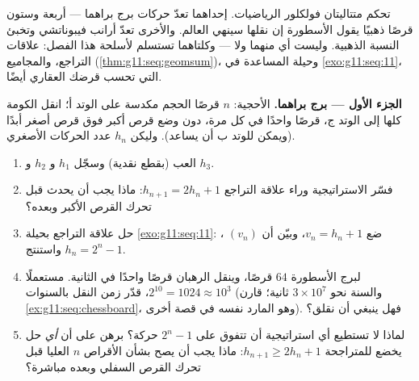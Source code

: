 \begin{problem}
\label{pb:g11:seq:1}
تحكم متتاليتان فولكلور الرياضيات. إحداهما تعدّ
حركات برج براهما --- أربعة وستون قرصًا ذهبيًا يقول
الأسطورة إن نقلها سينهي العالم. والأخرى تعدّ
أرانب فيبوناتشي وتخبئ النسبة الذهبية. وليست أي منهما
 ولا  --- وكلتاهما تستسلم لأسلحة هذا الفصل:
علاقات التراجع، والمجاميع 
(\cref{thm:g11:seq:geomsum})، وحيلة  المساعدة في
\cref{exo:g11:seq:11}، التي تحسب قرضك العقاري أيضًا.

\medskip
\noindent\textbf{الجزء الأول --- برج براهما.}
الأحجية: $n$ قرصًا  الحجم مكدسة على الوتد أ؛
انقل الكومة كلها إلى الوتد ج، قرصًا واحدًا في كل مرة، دون وضع
قرص أكبر فوق قرص أصغر أبدًا (ويمكن للوتد ب أن يساعد). وليكن $h_n$
عدد الحركات الأصغري.
\begin{enumerate}
  \item العب (بقطع نقدية) وسجّل $h_1$ و $h_2$ و $h_3$.
  \item فسّر الاستراتيجية وراء علاقة التراجع
        $h_{n+1} = 2h_n + 1$: ماذا يجب أن يحدث قبل تحرك
        القرص الأكبر وبعده؟
  \item حل علاقة التراجع بحيلة
        \cref{exo:g11:seq:11}: ضع $v_n = h_n + 1$، وبيّن أن
        $(v_n)$ ، واستنتج $h_n = 2^n - 1$.
  \item لبرج الأسطورة $64$ قرصًا، وينقل الرهبان
        قرصًا واحدًا في الثانية. مستعملًا $2^{10} = 1024 \approx 10^3$،
        قدّر زمن النقل بالسنوات (والسنة نحو
        $3 \times 10^7$ ثانية؛ قارن
        \cref{ex:g11:seq:chessboard}، وهو المارد نفسه في قصة
        أخرى). فهل ينبغي أن نقلق؟
  \item لماذا لا تستطيع أي استراتيجية أن تتفوق على $2^n - 1$ حركة؟ برهن
        على أن \emph{أي} حل يخضع للمتراجحة
        $h_{n+1} \geq 2 h_n + 1$: ماذا يجب أن يصح بشأن الأقراص
        $n$ العليا قبل تحرك القرص السفلي وبعده مباشرة؟
\end{enumerate}


\end{problem}
